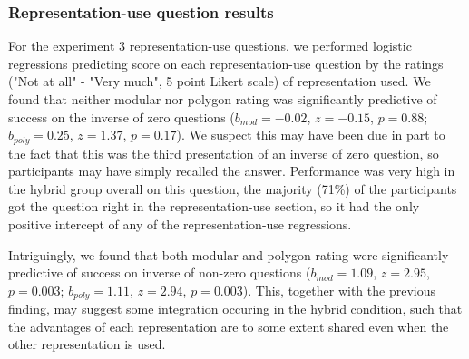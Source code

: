 \documentclass[man,10pt]{apa6}
\begin{document}
\subsubsection{Representation-use question results}
For the experiment 3 representation-use questions, we performed logistic regressions predicting score on each representation-use question by the ratings ("Not at all" - "Very much", 5 point Likert scale) of representation used. We found that neither modular nor polygon rating was significantly predictive of success on the inverse of zero questions ($b_{mod} = -0.02$, $z = -0.15$, $p = 0.88$; $b_{poly} = 0.25$, $z = 1.37$, $p = 0.17$). We suspect this may have been due in part to the fact that this was the third presentation of an inverse of zero question, so participants may have simply recalled the answer. Performance was very high in the hybrid group overall on this question, the majority (71\%) of the participants got the question right in the representation-use section, so it had the only positive intercept of any of the representation-use regressions.\par 
Intriguingly, we found that both modular and polygon rating were significantly predictive of success on inverse of non-zero questions ($b_{mod} = 1.09$, $z = 2.95$, $p = 0.003$; $b_{poly} = 1.11$, $z = 2.94$, $p = 0.003$). This, together with the previous finding, may suggest some integration occuring in the hybrid condition, such that the advantages of each representation are to some extent shared even when the other representation is used. 
\end{document}
